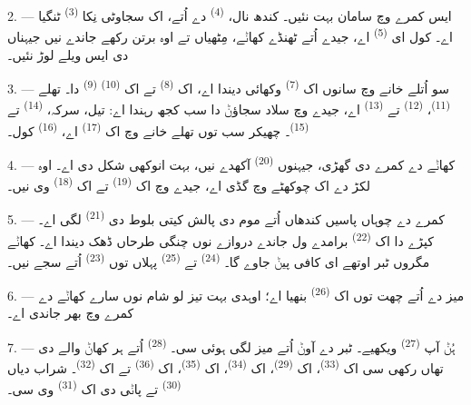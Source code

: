2. --- ایس کمرے وچ سامان بہت نئیں۔ کندھ نال،  \textsuperscript{(4)}
دے اُتے، اک سجاوٹی نِکا  \textsuperscript{(3)} ٹنگیا اے۔ کول ای
 \textsuperscript{(5)} اے، جیدے اُتے ٹھنڈے کھاݨے، مِٹھیاں تے
اوہ برتن رکھے جاندے نیں جیہناں دی ایس ویلے لوڑ نئیں۔

3. --- سو اُتلے خانے وچ سانوں اک  \textsuperscript{(7)} وکھائی
دیندا اے، اک  \textsuperscript{(8)} تے اک 
\textsuperscript{(10)}  \textsuperscript{(9)} دا۔ تھلے 
\textsuperscript{(11)}،  \textsuperscript{(12)} تے
 \textsuperscript{(13)} اے، جیدے وچ سلاد سجاؤݨ دا سب کجھ
رہندا اے: تیل، سرکہ،  \textsuperscript{(14)} تے 
\textsuperscript{(15)}۔ چھیکر سب توں تھلے خانے وچ اک  \textsuperscript{(17)}
اے،  \textsuperscript{(16)} کول۔

4. --- کھاݨے دے کمرے دی گھڑی، جیہنوں  \textsuperscript{(20)}
آکھدے نیں، بہت انوکھی شکل دی اے۔ اوہ لکڑ دے اک چوکھٹے وچ گڈی اے، جیدے وچ اک
 \textsuperscript{(19)} تے اک 
\textsuperscript{(18)} وی نیں۔

\VUsaut{4.6mm}
\VUsaut{3.0mm}

5. --- کمرے دے چوہاں پاسیں کندھاں اُتے موم دی پالش کیتی بلوط دی
 \textsuperscript{(21)} لگی اے۔ کپڑے دا اک
 \textsuperscript{(22)} برامدے ول جاندے دروازے نوں چنگی طرحاں
ڈھک دیندا اے۔ کھاݨے مگروں ٹبر اوتھے ای کافی پیݨ جاوے گا۔ 
\textsuperscript{(24)} تے  \textsuperscript{(25)} پہلاں توں
 \textsuperscript{(23)} اُتے سجے نیں۔

6. --- میز دے اُتے چھت توں اک  \textsuperscript{(26)} بنھیا اے؛
اوہدی بہت تیز لو شام نوں سارے کھاݨے دے کمرے وچ بھر جاندی اے۔

7. --- ہُݨ آپ  \textsuperscript{(27)} ویکھیے۔ ٹبر دے آوݨ اُتے
میز لگی ہوئی سی۔  \textsuperscript{(28)} اُتے ہر کھاݨ والے دی تھاں
رکھی سی اک  \textsuperscript{(33)}، اک 
\textsuperscript{(29)}، اک  \textsuperscript{(34)}، اک 
\textsuperscript{(35)}، اک  \textsuperscript{(36)} تے اک
 \textsuperscript{(32)}۔ شراب دیاں  \textsuperscript{(30)}
تے پاݨی دی اک  \textsuperscript{(31)} وی سی۔

